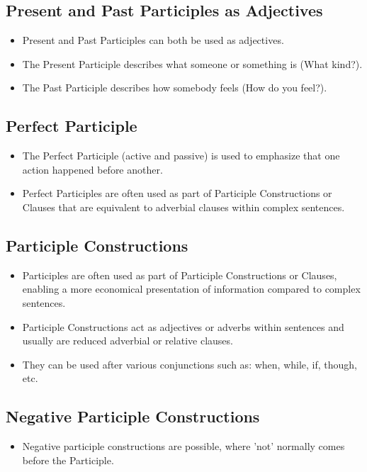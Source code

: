 \subsection*{Present and Past Participles as Adjectives}
\begin{itemize}
      \item Present and Past Participles can both be used as adjectives.
      \item The Present Participle describes what someone or something is (What kind?).
      \item The Past Participle describes how somebody feels (How do you feel?).
\end{itemize}

\subsection*{Perfect Participle}
\begin{itemize}
      \item The Perfect Participle (active and passive) is used to emphasize that one action happened before another.
      \item Perfect Participles are often used as part of Participle Constructions or Clauses that are equivalent to adverbial clauses within complex sentences.
\end{itemize}

\subsection*{Participle Constructions}
\begin{itemize}
      \item Participles are often used as part of Participle Constructions or Clauses, enabling a more economical presentation of information compared to complex sentences.
      \item Participle Constructions act as adjectives or adverbs within sentences and usually are reduced adverbial or relative clauses.
      \item They can be used after various conjunctions such as: when, while, if, though, etc.
\end{itemize}

\subsection*{Negative Participle Constructions}
\begin{itemize}
      \item Negative participle constructions are possible, where 'not' normally comes before the Participle.
\end{itemize}

